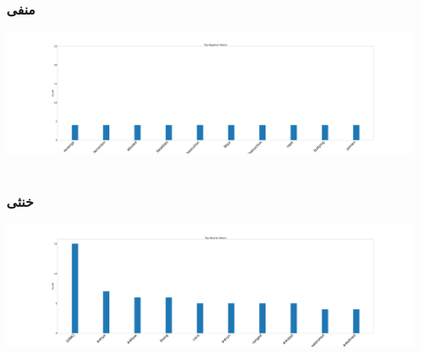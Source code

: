 {{		\subsubsection{\Large منفی}
		{ \setLR
			\begin{center}
				\includegraphics[scale=0.06]{../stats/top_10_most_repeated_tokens_negative.png}
			\end{center}
			\begin{align*}
			\end{align*}
		}
		\subsubsection{\Large خنثی}
		{ \setLR
			\begin{center}
				\includegraphics[scale=0.06]{../stats/top_10_most_repeated_tokens_neutral.png}
			\end{center}
			\begin{align*}
			\end{align*}
		}
	}
	\newpage
		
}
